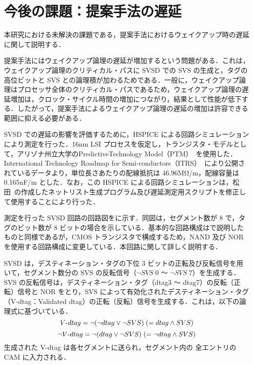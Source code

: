 
\chapter{今後の課題：提案手法の遅延}
\label{sec:appendix3}
本研究における未解決の課題である，提案手法におけるウェイクアップ時の遅延に関して説明する．

提案手法にはウェイクアップ論理の遅延が増加するという問題がある．これは，ウェイクアップ論理のクリティカル・パスに SVSD での SVS の生成と，タグの高位ビットと SVS との論理積が加わるためである．一般に，ウェイクアップ論理はプロセッサ全体のクリティカル・パスであるため，ウェイクアップ論理の遅延増加は，クロック・サイクル時間の増加につながり，結果として性能が低下する．したがって，提案手法によるウェイクアップ論理の遅延の増加は許容できる範囲に抑える必要がある．

SVSD での遅延の影響を評価するために，HSPICE による回路シミュレーションにより測定を行った．16nm LSI プロセスを仮定し，トランジスタ・モデルとして，アリゾナ州立大学のPredictiveTechnology Model（PTM）~\cite{model2012}を使用した．International Technology Roadmap for Semi-conductors（ITRS）~\cite{itrs2012}により公開されているデータより，単位長さあたりの配線抵抗は 46.96MΩ/m，配線容量は 0.165nF/m とした．なお，この HSPICE による回路シミュレーションは，松田~\cite{matsuda-thesis}の作成したネットリスト生成プログラム及び遅延測定用スクリプトを修正して使用することにより行った． 

測定を行った SVSD 回路の回路図をに示す．同図は，セグメント数が 8 で，タグのビット数が 8 ビットの場合を示している．基本的な回路構成はで説明したものと同様であるが，CMOS トランジスタで構成するため，NAND 及び NOR を使用する回路構成に変更している．本回路に関して詳しく説明する．

SVSD は，デスティネーション・タグの下位 3 ビットの正転及び反転信号を用いて，セグメント数分の SVS の反転信号（$\lnot SVS\;0$ 〜 $\lnot SVS\;7$）を生成する． SVS の反転信号は，デスティネーション・タグ（dtag3 〜 dtag7）の反転（正転）信号と NOR をとり，SVS によって有効化されたデスティネーション・タグ（V-dtag：Validated dtag）の正転（反転）信号を生成する．これは，以下の論理式に基づいている．
\[
  V\mathchar`-dtag = \lnot (\lnot dtag \lor \lnot SVS) \; (= dtag \land SVS) 
\]
\[
  \lnot V\mathchar`-dtag = \lnot (dtag \lor \lnot SVS) \; (= \lnot dtag \land SVS) 
\]
生成された V-dtag は各セグメントに送られ，セグメント内の 全エントリの CAM に入力される．

